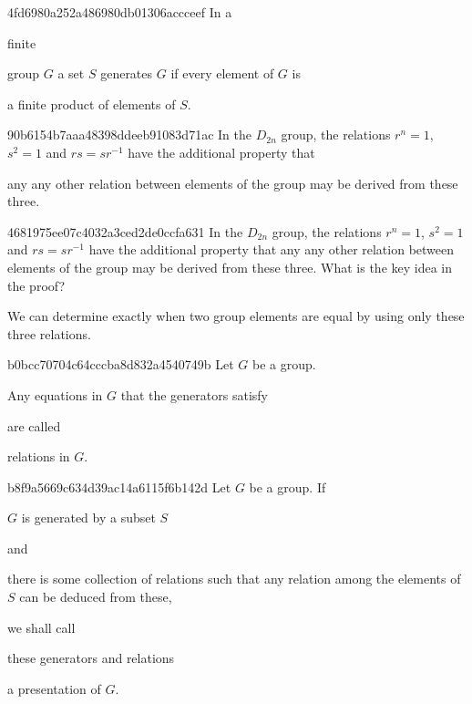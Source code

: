 \begin{note}{4fd6980a252a486980db01306accceef}
    In a \begin{icloze}{2}finite\end{icloze} group \({ G }\) a set \({ S }\) generates \({ G }\) if every element of \({ G }\) is \begin{icloze}{1}a finite product of elements of \({ S }\).\end{icloze}
\end{note}

\begin{note}{90b6154b7aaa48398ddeeb91083d71ac}
    In the \({ D_{2n}  }\) group, the relations \({ r^{n} = 1 }\), \({ s^2 = 1 }\) and \({ rs = s r^{-1} }\) have the additional property that \begin{icloze}{1}any any other relation between elements of the group may be derived from these three.\end{icloze}
\end{note}

\begin{note}{4681975ee07c4032a3ced2de0ccfa631}
    In the \({ D_{2n}  }\) group, the relations \({ r^{n} = 1 }\), \({ s^2 = 1 }\) and \({ rs = s r^{-1} }\) have the additional property that any any other relation between elements of the group may be derived from these three.
    What is the key idea in the proof?

    \begin{cloze}{1}
        We can determine exactly when two group elements are equal by using only these three relations.
    \end{cloze}
\end{note}

\begin{note}{b0bcc70704c64cccba8d832a4540749b}
    Let \({ G }\) be a group. \begin{icloze}{1}Any equations in \({ G }\) that the generators satisfy\end{icloze} are called \begin{icloze}{2}relations in \({ G }\).\end{icloze}
\end{note}

\begin{note}{b8f9a5669c634d39ac14a6115f6b142d}
    Let \({ G }\) be a group. If \begin{icloze}{4}\({ G }\) is generated by a subset \({ S }\)\end{icloze} and \begin{icloze}{3}there is some collection of relations such that any relation among the elements of \({ S }\) can be deduced from these,\end{icloze} we shall call \begin{icloze}{2}these generators and relations\end{icloze} \begin{icloze}{1}a presentation of \({ G }\).\end{icloze}
\end{note}

